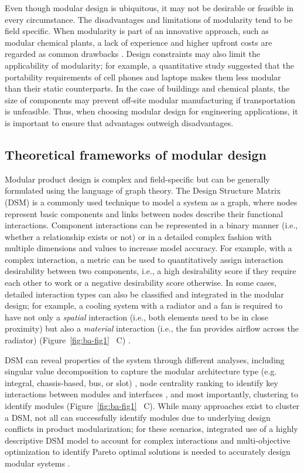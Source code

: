 Even though modular design is ubiquitous, it may not be desirable or feasible in every circumstance.
The disadvantages and limitations of modularity tend to be field specific.
When modularity is part of an innovative approach, such as modular chemical plants, a lack of experience and higher upfront costs are regarded as common drawbacks \citep{baldea2017}.
Design constraints may also limit the applicability of modularity; for example, a quantitative study \citep{RN26} suggested that the portability requirements of cell phones and laptops makes them less modular than their static counterparts.
In the case of buildings and chemical plants, the size of components may prevent off-site modular manufacturing if transportation is unfeasible.
Thus, when choosing modular design for engineering applications, it is important to ensure that advantages outweigh disadvantages.

\subsection{Theoretical frameworks of modular design}

Modular product design is complex and field-specific but can be generally formulated using the language of graph theory.
The Design Structure Matrix (DSM) \citep{browning2016} is a commonly used technique to model a system as a graph, where nodes represent basic components and links between nodes describe their functional interactions.
Component interactions can be represented in a binary manner (i.e., whether a relationship exists or not) or in a detailed complex fashion with multiple dimensions and values to increase model accuracy.
For example, with a complex interaction, a metric can be used to quantitatively assign interaction desirability between two components, i.e., a high desirability score if they require each other to work or a negative desirability score otherwise.
In some cases, detailed interaction types can also be classified and integrated in the modular design; for example, a cooling system with a radiator and a fan is required to have not only a \emph{spatial} interaction (i.e., both elements need to be in close proximity) but also a \emph{material} interaction (i.e., the fan provides airflow across the radiator) (Figure~\ref{fig:ba-fig1}~ C) \citep{helmer2010}.

DSM can reveal properties of the system through different analyses, including singular value decomposition to capture the modular architecture type (e.g.
integral, chassis-based, bus, or slot) \citep{RN26}, node centrality ranking to identify key interactions between modules and interfaces \citep{sosa2007}, and most importantly, clustering to identify modules (Figure~\ref{fig:ba-fig1}~ C).
While many approaches exist to cluster a DSM, not all can successfully identify modules due to underlying design conflicts in product modularization; for these scenarios, integrated use of a highly descriptive DSM model to account for complex interactions and multi-objective optimization to identify Pareto optimal solutions is needed to accurately design modular systems \citep{helmer2010}.

